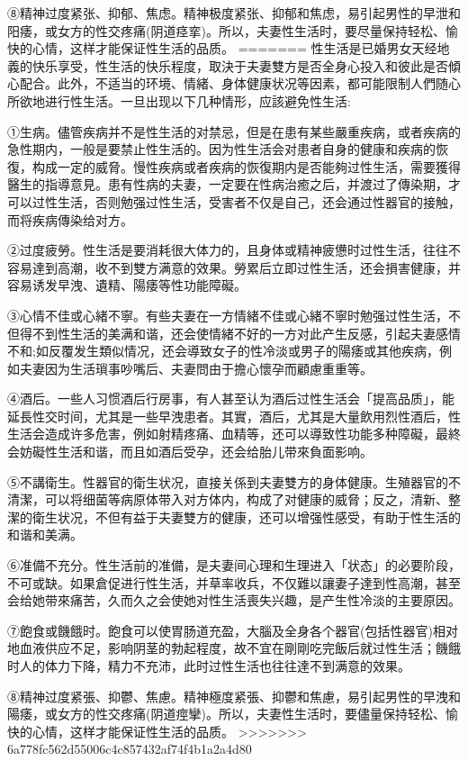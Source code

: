 \documentclass[12pt,UTF8]{ctexbook}
\begin{document}
⑧精神过度紧张、抑郁、焦虑。精神极度紧张、抑郁和焦虑，易引起男性的早泄和阳痿，或女方的性交疼痛(阴道痉挛)。所以，夫妻性生活时，要尽量保持轻松、愉快的心情，这样才能保证性生活的品质。
=======
性生活是已婚男女天经地義的快乐享受，性生活的快乐程度，取決于夫妻雙方是否全身心投入和彼此是否傾心配合。此外，不适当的环境、情緒、身体健康状况等因素，都可能限制人們随心所欲地进行性生活。一旦出现以下几种情形，应該避免性生活:

①生病。儘管疾病并不是性生活的对禁忌，但是在患有某些嚴重疾病，或者疾病的急性期内，一般是要禁止性生活的。因为性生活会对患者自身的健康和疾病的恢復，构成一定的威脅。慢性疾病或者疾病的恢復期内是否能夠过性生活，需要獲得醫生的指導意見。患有性病的夫妻，一定要在性病治癒之后，并渡过了傳染期，才可以过性生活，否则勉强过性生活，受害者不仅是自己，还会通过性器官的接触，而将疾病傳染给对方。

②过度疲勞。性生活是要消耗很大体力的，且身体或精神疲憊时过性生活，往往不容易達到高潮，收不到雙方满意的效果。勞累后立即过性生活，还会損害健康，并容易诱发早洩、遺精、陽痿等性功能障礙。

③心情不佳或心緒不寧。有些夫妻在一方情緒不佳或心緒不寧时勉强过性生活，不但得不到性生活的美满和谐，还会使情緒不好的一方对此产生反感，引起夫妻感情不和;如反覆发生類似情况，还会導致女子的性冷淡或男子的陽痿或其他疾病，例如夫妻因为生活瑣事吵嘴后、夫妻問由于擔心懷孕而顧慮重重等。

④酒后。一些人习惯酒后行房事，有人甚至认为酒后过性生活会「提高品质」，能延長性交时间，尤其是一些早洩患者。其實，酒后，尤其是大量飲用烈性酒后，性生活会造成许多危害，例如射精疼痛、血精等，还可以導致性功能多种障礙，最終会妨礙性生活和谐，而且如酒后受孕，还会给胎儿带來負面影响。

⑤不講衛生。性器官的衛生状况，直接关係到夫妻雙方的身体健康。生殖器官的不清潔，可以将细菌等病原体带入对方体内，构成了对健康的威脅；反之，清新、整潔的衛生状况，不但有益于夫妻雙方的健康，还可以增强性感受，有助于性生活的和谐和美满。

⑥准備不充分。性生活前的准備，是夫妻间心理和生理进入「状态」的必要阶段，不可或缺。如果倉促进行性生活，并草率收兵，不仅難以讓妻子達到性高潮，甚至会给她带來痛苦，久而久之会使她对性生活喪失兴趣，是产生性冷淡的主要原因。

⑦飽食或饑餓时。飽食可以使胃肠道充盈，大腦及全身各个器官(包括性器官)相对地血液供应不足，影响阴茎的勃起程度，故不宜在剛剛吃完飯后就过性生活；饑餓时人的体力下降，精力不充沛，此时过性生活也往往達不到满意的效果。

⑧精神过度紧張、抑鬱、焦慮。精神極度紧張、抑鬱和焦慮，易引起男性的早洩和陽痿，或女方的性交疼痛(阴道痙攣)。所以，夫妻性生活时，要儘量保持轻松、愉快的心情，这样才能保证性生活的品质。
>>>>>>> 6a778fc562d55006c4c857432af74f4b1a2a4d80
\end{document}

